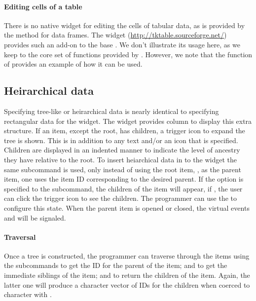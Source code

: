 \paragraph{Editing cells of a table}
There is no native widget for editing the cells of tabular data, as is
provided by the  method for data frames. The
 widget (\url{http://tktable.sourceforge.net/}) provides
such an add-on to the base \TK. We don't illustrate its usage here, as
we keep to the core set of functions provided by \TK. However, we note
that the  function of  provides an
example of how it can be used.



\subsection{Heirarchical data}

Specifying tree-like or heirarchical data is nearly identical to
specifying rectangular data for the  widget.  The
widget provides column  to display this extra structure. If
an item, except the root, has children, a trigger icon to expand the
tree is shown. This is in addition to any text and/or an icon that is
specified. Children are displayed in an indented manner to indicate
the level of ancestry they have relative to the root.  To insert
heiarchical data in to the widget the same
 subcommand is used, only instead of
using the root item, \qcode{}, as the parent item, one uses the item
ID corresponding to the desired parent. If the option 
is specified to the  subcommand, the children of the item
will appear, if , the user can click the trigger icon to
see the children. The programmer can use the
 to configure this state. When the
parent item is opened or closed, the virtual events
 and  will be
signaled.



\paragraph{Traversal}
Once a tree is constructed, the programmer can traverse
through the items using the subcommands
 to get the ID for the parent of the
item;  and
 to get the immediate siblings of the
item; and  to return the children of
the item. Again, the latter one will produce a character vector of  IDs for the
children when coerced to character with .



